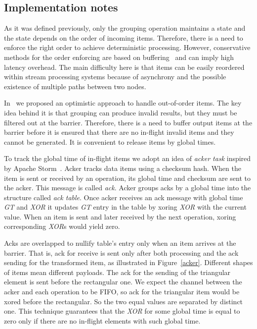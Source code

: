 \subsection{Implementation notes}

As it was defined previously, only the grouping operation maintains a state and the state depends on the order of incoming items. Therefore, there is a need to enforce the right order to achieve deterministic processing. However, conservative methods for the order enforcing are based on buffering~\cite{Li:2008:OPN:1453856.1453890} and can imply high latency overhead. The main difficulty here is that items can be easily reordered within stream processing systems because of asynchrony and the possible existence of multiple paths between two nodes. 

In~\cite{we2018seim} we proposed an optimistic approach to handle out-of-order items. The key idea behind it is that grouping can produce invalid results, but they must be filtered out at the barrier. Therefore, there is a need to buffer output items at the barrier before it is ensured that there are no in-flight invalid items and they cannot be generated. It is convenient to release items by global times.

To track the global time of in-flight items we adopt an idea of {\it acker task} inspired by Apache Storm~\cite{apache:storm}. Acker tracks data items using a checksum hash. When the item is sent or received by an operation, its global time and checksum are sent to the acker. This message is called {\it ack}. Acker groups acks by a global time into the structure called {\it ack table}. Once acker receives an ack message with global time {\it GT} and {\it XOR} it updates {\it GT} entry in the table by xoring {\it XOR} with the current value. When an item is sent and later received by the next operation, xoring corresponding {\it XOR}s would yield zero.

Acks are overlapped to nullify table's entry only when an item arrives at the barrier. That is, ack for receive is sent only after both processing and the ack sending for the transformed item, as illustrated in Figure~\ref{acker}. Different shapes of items mean different payloads. The ack for the sending of the triangular element is sent before the rectangular one. We expect the channel between the acker and each operation to be FIFO, so ack for the triangular item would be xored before the rectangular. So the two equal values are separated by distinct one. This technique guarantees that the {\it XOR} for some global time is equal to zero only if there are no in-flight elements with such global time.


